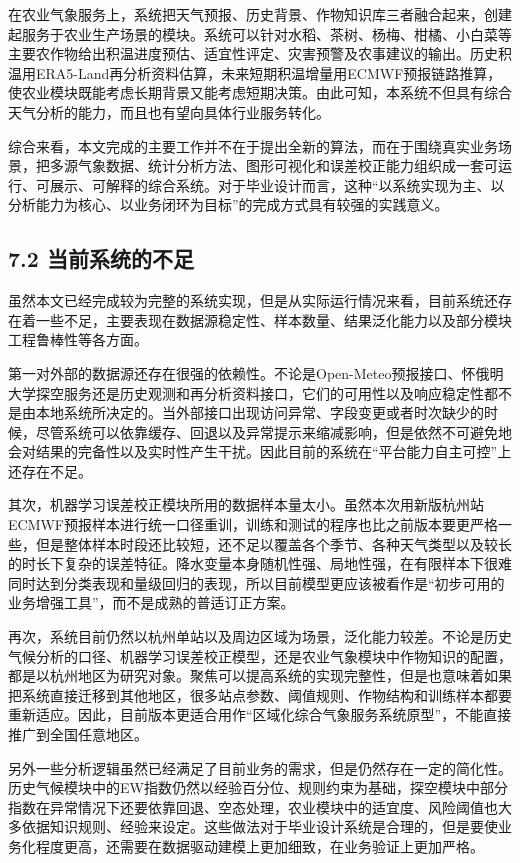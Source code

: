 在农业气象服务上，系统把天气预报、历史背景、作物知识库三者融合起来，创建起服务于农业生产场景的模块。系统可以针对水稻、茶树、杨梅、柑橘、小白菜等主要农作物给出积温进度预估、适宜性评定、灾害预警及农事建议的输出。历史积温用ERA5-Land再分析资料估算，未来短期积温增量用ECMWF预报链路推算，使农业模块既能考虑长期背景又能考虑短期决策。由此可知，本系统不但具有综合天气分析的能力，而且也有望向具体行业服务转化。

综合来看，本文完成的主要工作并不在于提出全新的算法，而在于围绕真实业务场景，把多源气象数据、统计分析方法、图形可视化和误差校正能力组织成一套可运行、可展示、可解释的综合系统。对于毕业设计而言，这种“以系统实现为主、以分析能力为核心、以业务闭环为目标”的完成方式具有较强的实践意义。

\subsection{7.2 当前系统的不足}

虽然本文已经完成较为完整的系统实现，但是从实际运行情况来看，目前系统还存在着一些不足，主要表现在数据源稳定性、样本数量、结果泛化能力以及部分模块工程鲁棒性等各方面。

第一对外部的数据源还存在很强的依赖性。不论是Open-Meteo预报接口、怀俄明大学探空服务还是历史观测和再分析资料接口，它们的可用性以及响应稳定性都不是由本地系统所决定的。当外部接口出现访问异常、字段变更或者时次缺少的时候，尽管系统可以依靠缓存、回退以及异常提示来缩减影响，但是依然不可避免地会对结果的完备性以及实时性产生干扰。因此目前的系统在“平台能力自主可控”上还存在不足。

其次，机器学习误差校正模块所用的数据样本量太小。虽然本次用新版杭州站ECMWF预报样本进行统一口径重训，训练和测试的程序也比之前版本要更严格一些，但是整体样本时段还比较短，还不足以覆盖各个季节、各种天气类型以及较长的时长下复杂的误差特征。降水变量本身随机性强、局地性强，在有限样本下很难同时达到分类表现和量级回归的表现，所以目前模型更应该被看作是“初步可用的业务增强工具”，而不是成熟的普适订正方案。

再次，系统目前仍然以杭州单站以及周边区域为场景，泛化能力较差。不论是历史气候分析的口径、机器学习误差校正模型，还是农业气象模块中作物知识的配置，都是以杭州地区为研究对象。聚焦可以提高系统的实现完整性，但是也意味着如果把系统直接迁移到其他地区，很多站点参数、阈值规则、作物结构和训练样本都要重新适应。因此，目前版本更适合用作“区域化综合气象服务系统原型”，不能直接推广到全国任意地区。

另外一些分析逻辑虽然已经满足了目前业务的需求，但是仍然存在一定的简化性。历史气候模块中的EW指数仍然以经验百分位、规则约束为基础，探空模块中部分指数在异常情况下还要依靠回退、空态处理，农业模块中的适宜度、风险阈值也大多依据知识规则、经验来设定。这些做法对于毕业设计系统是合理的，但是要使业务化程度更高，还需要在数据驱动建模上更加细致，在业务验证上更加严格。

